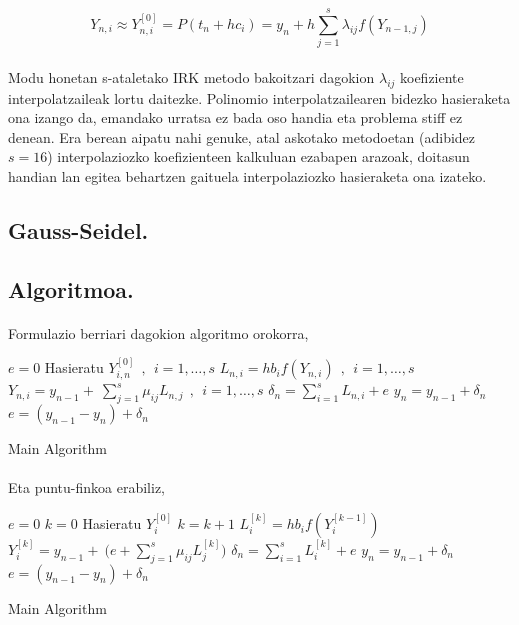 \begin{equation}
Y_{n,i} \approx Y_{n,i}^{[0]}= P(t_n+hc_i) = y_n+ h \sum\limits_{j=1}^{s} \lambda_{ij}f(Y_{n-1,j})
\end{equation}

\paragraph*{} Modu honetan s-ataletako IRK metodo bakoitzari dagokion $\lambda_{ij}$ koefiziente interpolatzaileak lortu daitezke. Polinomio interpolatzailearen bidezko hasieraketa ona izango da, emandako urratsa ez bada oso handia eta problema stiff ez denean. Era berean aipatu nahi genuke, atal askotako metodoetan (adibidez $s=16$)  interpolaziozko koefizienteen kalkuluan ezabapen arazoak,  doitasun handian lan egitea behartzen gaituela interpolaziozko hasieraketa ona izateko.  

\subsection{Gauss-Seidel.}

\subsection{Algoritmoa.}

\paragraph*{} Formulazio berriari dagokion algoritmo orokorra,

\begin{algorithm}[H]
 \BlankLine
  $e=0$\;
  {
   \BlankLine
   Hasieratu  $Y_{i,n}^{[0]} \ \ , \ \ i=1,\dots,s $\;
   \BlankLine
   {
    \BlankLine 
    $L_{n,i}=hb_if(Y_{n,i}) \ \ , \ \  i=1,\dots,s$\;
    $Y_{n,i}=y_{n-1}+ \ \sum\limits_{j=1}^{s} \mu_{ij} L_{n,j}  \ \ , \ \  i=1,\dots,s$\;  
   }
   \BlankLine
    $\delta_{n}= \sum\limits_{i=1}^{s} L_{n,i}+e $\;
    $y_{n}=y_{n-1}+ \delta_{n} $\;
    $e=(y_{n-1}-y_n)+\delta_n$\;
   \BlankLine
 }
 \caption{Main Algorithm}
\end{algorithm}


\paragraph*{} Eta puntu-finkoa erabiliz,

\begin{algorithm}[H]
 \BlankLine
  $e=0$\;
  {
   \BlankLine
   $k=0$\;
   Hasieratu  $Y_{i}^{[0]}$\;
   \BlankLine
   {
    \BlankLine 
    $k=k+1$\;
    $L_{i}^{[k]}=hb_if(Y_{i}^{[k-1]}) $\;
    $Y_{i}^{[k]}=y_{n-1} + \ \big(e+\sum\limits_{j=1}^{s} \mu_{ij} L_{j}^{[k]}\big)  $\;  
   }
   \BlankLine
    $\delta_{n}= \sum\limits_{i=1}^{s} L_{i}^{[k]}+e $\;
    $y_{n}=y_{n-1}+ \delta_{n} $\;
    $e=(y_{n-1}-y_n)+\delta_n$\;
   \BlankLine
 }
 \caption{Main Algorithm}
\end{algorithm}


